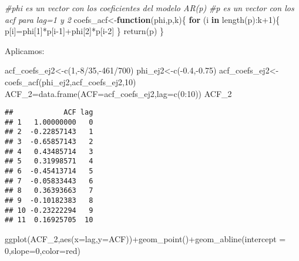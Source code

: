 \documentclass[
]{article}
\newenvironment{Shaded}{\begin{snugshade}}{\end{snugshade}}
\newcommand{\AttributeTok}[1]{\textcolor[rgb]{0.77,0.63,0.00}{#1}}
\newcommand{\CommentTok}[1]{\textcolor[rgb]{0.56,0.35,0.01}{\textit{#1}}}
\newcommand{\ControlFlowTok}[1]{\textcolor[rgb]{0.13,0.29,0.53}{\textbf{#1}}}
\newcommand{\DecValTok}[1]{\textcolor[rgb]{0.00,0.00,0.81}{#1}}
\newcommand{\FloatTok}[1]{\textcolor[rgb]{0.00,0.00,0.81}{#1}}
\newcommand{\FunctionTok}[1]{\textcolor[rgb]{0.00,0.00,0.00}{#1}}
\newcommand{\NormalTok}[1]{#1}
\newcommand{\OtherTok}[1]{\textcolor[rgb]{0.56,0.35,0.01}{#1}}
\newcommand{\SpecialCharTok}[1]{\textcolor[rgb]{0.00,0.00,0.00}{#1}}
\newcommand{\StringTok}[1]{\textcolor[rgb]{0.31,0.60,0.02}{#1}}
\begin{document}
\begin{Shaded}
\begin{Highlighting}[]
\CommentTok{\#phi es un vector con los coeficientes del modelo AR(p)}
\CommentTok{\#p es un vector con los acf para lag=1 y 2}
\NormalTok{coefs\_acf}\OtherTok{\textless{}{-}}\ControlFlowTok{function}\NormalTok{(phi,p,k)\{}
  \ControlFlowTok{for}\NormalTok{ (i }\ControlFlowTok{in} \FunctionTok{length}\NormalTok{(p)}\SpecialCharTok{:}\NormalTok{k}\SpecialCharTok{+}\DecValTok{1}\NormalTok{)\{}
\NormalTok{    p[i]}\OtherTok{=}\NormalTok{phi[}\DecValTok{1}\NormalTok{]}\SpecialCharTok{*}\NormalTok{p[i}\DecValTok{{-}1}\NormalTok{]}\SpecialCharTok{+}\NormalTok{phi[}\DecValTok{2}\NormalTok{]}\SpecialCharTok{*}\NormalTok{p[i}\DecValTok{{-}2}\NormalTok{]}
\NormalTok{  \}}
  \FunctionTok{return}\NormalTok{(p)}
\NormalTok{\}}
\end{Highlighting}
\end{Shaded}

Aplicamos:

\begin{Shaded}
\begin{Highlighting}[]
\NormalTok{acf\_coefs\_ej2}\OtherTok{\textless{}{-}}\FunctionTok{c}\NormalTok{(}\DecValTok{1}\NormalTok{,}\SpecialCharTok{{-}}\DecValTok{8}\SpecialCharTok{/}\DecValTok{35}\NormalTok{,}\SpecialCharTok{{-}}\DecValTok{461}\SpecialCharTok{/}\DecValTok{700}\NormalTok{)}
\NormalTok{phi\_ej2}\OtherTok{\textless{}{-}}\FunctionTok{c}\NormalTok{(}\SpecialCharTok{{-}}\FloatTok{0.4}\NormalTok{,}\SpecialCharTok{{-}}\FloatTok{0.75}\NormalTok{)}
\NormalTok{acf\_coefs\_ej2}\OtherTok{\textless{}{-}}\FunctionTok{coefs\_acf}\NormalTok{(phi\_ej2,acf\_coefs\_ej2,}\DecValTok{10}\NormalTok{)}
\NormalTok{ACF\_2}\OtherTok{=}\FunctionTok{data.frame}\NormalTok{(}\AttributeTok{ACF=}\NormalTok{acf\_coefs\_ej2,}\AttributeTok{lag=}\FunctionTok{c}\NormalTok{(}\DecValTok{0}\SpecialCharTok{:}\DecValTok{10}\NormalTok{))}
\NormalTok{ACF\_2}
\end{Highlighting}
\end{Shaded}

\begin{verbatim}
##            ACF lag
## 1   1.00000000   0
## 2  -0.22857143   1
## 3  -0.65857143   2
## 4   0.43485714   3
## 5   0.31998571   4
## 6  -0.45413714   5
## 7  -0.05833443   6
## 8   0.36393663   7
## 9  -0.10182383   8
## 10 -0.23222294   9
## 11  0.16925705  10
\end{verbatim}

\begin{Shaded}
\begin{Highlighting}[]
\FunctionTok{ggplot}\NormalTok{(ACF\_2,}\FunctionTok{aes}\NormalTok{(}\AttributeTok{x=}\NormalTok{lag,}\AttributeTok{y=}\NormalTok{ACF))}\SpecialCharTok{+}\FunctionTok{geom\_point}\NormalTok{()}\SpecialCharTok{+}\FunctionTok{geom\_abline}\NormalTok{(}\AttributeTok{intercept =} \DecValTok{0}\NormalTok{,}\AttributeTok{slope=}\DecValTok{0}\NormalTok{,}\AttributeTok{color=}\StringTok{\textquotesingle{}red\textquotesingle{}}\NormalTok{)}
\end{Highlighting}
\end{Shaded}
\end{document}
